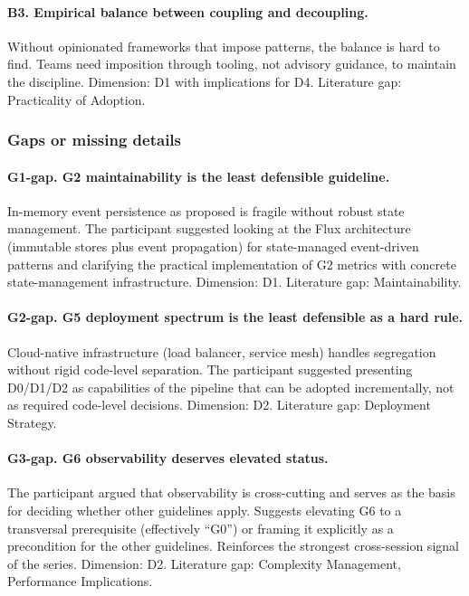 \paragraph*{B3. Empirical balance between coupling and decoupling.} Without opinionated frameworks that impose patterns, the balance is hard to find. Teams need imposition through tooling, not advisory guidance, to maintain the discipline. Dimension: D1 with implications for D4. Literature gap: Practicality of Adoption.

\subsubsection*{Gaps or missing details}

\paragraph*{G1-gap. G2 maintainability is the least defensible guideline.} In-memory event persistence as proposed is fragile without robust state management. The participant suggested looking at the Flux architecture (immutable stores plus event propagation) for state-managed event-driven patterns and clarifying the practical implementation of G2 metrics with concrete state-management infrastructure. Dimension: D1. Literature gap: Maintainability.

\paragraph*{G2-gap. G5 deployment spectrum is the least defensible as a hard rule.} Cloud-native infrastructure (load balancer, service mesh) handles segregation without rigid code-level separation. The participant suggested presenting D0/D1/D2 as capabilities of the pipeline that can be adopted incrementally, not as required code-level decisions. Dimension: D2. Literature gap: Deployment Strategy.

\paragraph*{G3-gap. G6 observability deserves elevated status.} The participant argued that observability is cross-cutting and serves as the basis for deciding whether other guidelines apply. Suggests elevating G6 to a transversal prerequisite (effectively ``G0'') or framing it explicitly as a precondition for the other guidelines. Reinforces the strongest cross-session signal of the series. Dimension: D2. Literature gap: Complexity Management, Performance Implications.

